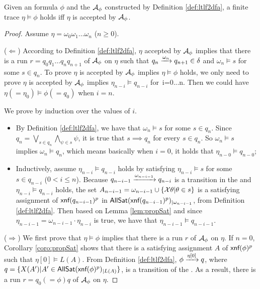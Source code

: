 \begin{theorem}
Given an \ltlf formula $\phi$ and the \tdfa ${\mathcal{A}_{\phi}}$ constructed by Definition \ref{def:ltlf2dfa}, a finite trace $\eta\models\phi$ holds iff $\eta$ is accepted by ${\mathcal{A}_{\phi}}$. 
\end{theorem}
\begin{proof}
Assume $\eta = \omega_0\omega_1\ldots\omega_n$ ($n\geq 0$). 

($\Leftarrow$) 
According to Definition \ref{def:ltlf2dfa},  $\eta$ accepted by ${\mathcal{A}_{\phi}}$ implies that there is a run $r=q_0q_1\ldots q_n q_{n+1}$ of ${\mathcal{A}_{\phi}}$ on $\eta$ such that $q_{n}\xrightarrow[]{\omega_{n}}q_{n+1} \in \delta$ and $\omega_n\models s$ for some $s\in q_n$.
To prove $\eta$ is accepted by ${\mathcal{A}_{\phi}}$ implies $\eta\models\phi$ holds, we only need to prove $\eta$ is accepted by ${\mathcal{A}_{\phi}}$ implies $\eta_{n-i}\models q_{n-i}$ for\ i=0...n. Then we could have $\eta (=\eta_0)\models \phi (=q_0)$ when $i=n$.

We prove by induction over the values of $i$.
\begin{itemize}
	\item By Definition \ref{def:ltlf2dfa}, we have that $\omega_n\models s$ for some $s\in q_n$. Since $q_n = \bigvee_{s\in q_n}\bigwedge_{\psi\in s}\psi$, it is true that $s\implies q_n$ for every $s\in q_n$. So $\omega_n\models s$ implies $\omega_n\models q_n$, which means basically when $i = 0$, it holds that $\eta_{n-0}\models q_{n-0}$;
	\item Inductively, assume $\eta_{n-i}\models q_{n-i}$ holds by satisfying $\eta_{n-i}\models s$ for some $s\in q_{n-i}$ ($0<i\leq n$). Because $q_{n-i-1}\xrightarrow[]{\omega_{n-i-1}}q_{n-i}$ is a transition in the \TDFA and $\eta_{n-i}\models q_{n-i}$ holds, the set $A_{n-i-1} = \omega_{n-i-1}\cup \{\mathcal{X}\theta | \theta\in s\}$ is a satisfying assignment of $\textsf{xnf}(q_{n-i-1})^p$ in ${\sf AllSat}(\textsf{xnf}(q_{n-i-1})^p)_{|\omega_{n-i-1}}$, from Definition \ref{def:ltlf2dfa}. Then based on Lemma \ref{lem:propSat} and since $\eta_{n-i-1}=\omega_{n-i-1}\cdot\eta_{n-i}$ is true, we have that $\eta_{n-i-1}\models q_{n-i-1}$.
\end{itemize}

($\Rightarrow$) We first prove that $\eta\models\phi$ implies that there is a run $r$ of ${\mathcal{A}_{\phi}}$ on $\eta$. 
If $n = 0$, Corollary \ref{coro:propSat} shows that there is a satisfying assignment $A$ of $\textsf{xnf}(\phi)^p$ such that $\eta[0]\models L(A)$. From Definition \ref{def:ltlf2dfa}, $\phi\xrightarrow[]{\eta[0]}q$, where $q=\{X(A') | A'\in{\sf AllSat}(\textsf{xnf}(\phi)^p)_{|L(A)}\}$, is a transition of the \TDFA. As a result, there is a run $r=q_0(=\phi)q$ of ${\mathcal{A}_{\phi}}$ on $\eta$.
 

\end{proof}
